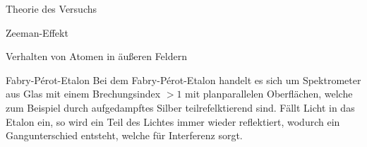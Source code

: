 \documentclass[pdftex, a4paper,11pt, twoside, ngerman]{report}
\begin{document}
\begin{chapter}{Theorie des Versuchs}
\begin{section}{Zeeman-Effekt}
\begin{subsection}{Verhalten von Atomen in äußeren Feldern}
      \end{subsection}
      
      
      
      \begin{subsection}{Fabry-Pérot-Etalon}
        Bei dem Fabry-Pérot-Etalon handelt es sich um Spektrometer aus Glas mit
        einem Brechungsindex $>1$ mit planparallelen Oberflächen, welche zum
        Beispiel durch aufgedampftes Silber teilrefelktierend sind. Fällt Licht
        in das Etalon ein, so wird ein Teil des Lichtes immer wieder
        reflektiert, wodurch ein Gangunterschied entsteht, welche für
        Interferenz sorgt. 
        

\end{subsection}
\end{section}
\end{chapter}
\end{document}
